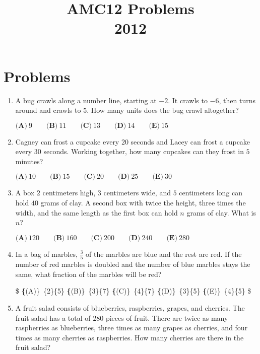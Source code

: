 \documentclass{article}
\title{AMC12 Problems \\ 2012}
\date{}
\begin{document}
\maketitle\thispagestyle{fancy}\newpage\section*{Problems}\begin{enumerate}[label=\arabic*., itemsep=0.5em]\item A bug crawls along a number line, starting at $-2$. It crawls to $-6$, then turns around and crawls to $5$. How many units does the bug crawl altogether?

$ \textbf{(A)}\ 9\qquad\textbf{(B)}\ 11\qquad\textbf{(C)}\ 13\qquad\textbf{(D)}\ 14\qquad\textbf{(E)}\ 15 $\par \vspace{0.5em}\item Cagney can frost a cupcake every $20$ seconds and Lacey can frost a cupcake every $30$ seconds. Working together, how many cupcakes can they frost in $5$ minutes?

$ \textbf{(A)}\ 10\qquad\textbf{(B)}\ 15\qquad\textbf{(C)}\ 20\qquad\textbf{(D)}\ 25\qquad\textbf{(E)}\ 30 $\par \vspace{0.5em}\item A box $2$ centimeters high, $3$ centimeters wide, and $5$ centimeters long can hold $40$ grams of clay.  A second box with twice the height, three times the width, and the same length as the first box can hold $n$ grams of clay.  What is $n$?

$\textbf{(A)}\ 120\qquad\textbf{(B)}\ 160\qquad\textbf{(C)}\ 200\qquad\textbf{(D)}\ 240\qquad\textbf{(E)}\ 280$\par \vspace{0.5em}\item In a bag of marbles, $\tfrac{3}{5}$ of the marbles are blue and the rest are red.  If the number of red marbles is doubled and the number of blue marbles stays the same, what fraction of the marbles will be red?

\$ \textbf\{(A)\}\ \dfrac\{2\}\{5\}
\qquad\textbf\{(B)\}\ \dfrac\{3\}\{7\}
\qquad\textbf\{(C)\}\ \dfrac\{4\}\{7\}
\qquad\textbf\{(D)\}\ \dfrac\{3\}\{5\}
\qquad\textbf\{(E)\}\ \dfrac\{4\}\{5\}
 \$\par \vspace{0.5em}\item A fruit salad consists of blueberries, raspberries, grapes, and cherries.  The fruit salad has a total of $280$ pieces of fruit.  There are twice as many raspberries as blueberries, three times as many grapes as cherries, and four times as many cherries as raspberries.  How many cherries are there in the fruit salad?


\end{enumerate}
\end{document}
